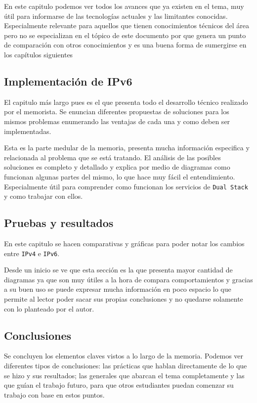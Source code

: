 \documentclass[spanish, fleqn]{article}
\begin{document}
    En este capitulo podemos ver todos los avances que ya existen en el tema,
    muy útil para informarse de las tecnologías actuales y las limitantes
    conocidas. Especialmente relevante para aquellos que tienen conocimientos
    técnicos del área pero no se especializan en el tópico de este documento por
    que genera un punto de comparación con otros conocimientos y es una buena
    forma de sumergirse en los capítulos siguientes

    \subsection{Implementación de IPv6}
    El capitulo más largo pues es el que presenta todo el desarrollo técnico
    realizado por el memorista. Se enuncian diferentes propuestas de soluciones
    para los mismos problemas enumerando las ventajas de cada una y como deben
    ser implementadas. 

    Esta es la parte medular de la memoria, presenta mucha información
    especifica y relacionada al problema que se está tratando. El análisis de
    las posibles soluciones es completo y detallado y explica por medio de
    diagramas como funcionan algunas partes del mismo, lo que hace muy fácil el
    entendimiento. Especialmente útil para comprender como funcionan los
    servicios de \texttt{Dual Stack} y como trabajar con ellos.

    \subsection{Pruebas y resultados}
    En este capitulo se hacen comparativas y gráficas para poder notar los
    cambios entre \texttt{IPv4} e \texttt{IPv6}. 

    Desde un inicio se ve que esta sección es la que presenta mayor cantidad de
    diagramas ya que son muy útiles a la hora de compara comportamientos y
    gracias a su buen uso se puede expresar mucha información en poco espacio lo
    que permite al lector poder sacar sus propias conclusiones y no quedarse
    solamente con lo planteado por el autor.
 
    \subsection{Conclusiones}
    Se concluyen los elementos claves vistos a lo largo de la memoria. Podemos
    ver diferentes tipos de conclusiones: las prácticas que hablan directamente
    de lo que se hizo y sus resultados; las generales que abarcan el tema
    completamente y las que guían el trabajo futuro, para que otros estudiantes
    puedan comenzar su trabajo con base en estos puntos.
\end{document}
